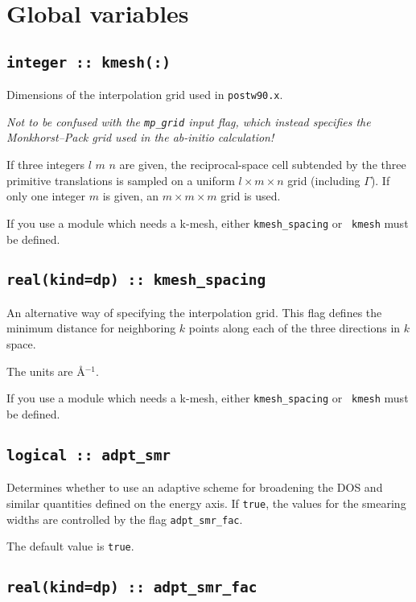 \clearpage
\section{Global variables}
\label{sec:postw90-globalflags}

  \subsection[kmesh]{\tt  integer :: kmesh(:)}  
Dimensions of the interpolation grid used in {\tt postw90.x}.

\emph{Not to be confused with the {\tt mp\_grid} 
input flag, which
  instead specifies the Monkhorst--Pack grid used in the ab-initio calculation!}

If three integers $l$ $m$ $n$ are given, the reciprocal-space cell
subtended by the three primitive translations is sampled on a uniform
$l\times m\times n$ grid (including $\Gamma$).  If only one integer $m$ is given, an
$m\times m\times m$ grid is used.

If you use a module which needs a k-mesh, either {\tt kmesh\_spacing} or {\tt
  kmesh} must be defined.

  \subsection[kmesh\_spacing]{\tt real(kind=dp) :: kmesh\_spacing}
An alternative way of specifying the interpolation grid.
This flag defines the minimum distance for
neighboring $k$ points along each of the three directions in $k$
space. 

The units are \AA$^{-1}$.

If you use a module which needs a k-mesh, either {\tt kmesh\_spacing} or {\tt
  kmesh} must be defined.

\subsection[adpt\_smr]{\tt logical :: adpt\_smr}
Determines whether to use an adaptive scheme for broadening the
DOS and similar quantities defined on the energy axis.
If \verb#true#, the values for the smearing widths are 
controlled by the flag {\tt adpt\_smr\_fac}.

The default value is \verb#true#.

\subsection[adpt\_smr\_fac]{\tt real(kind=dp) :: adpt\_smr\_fac}

